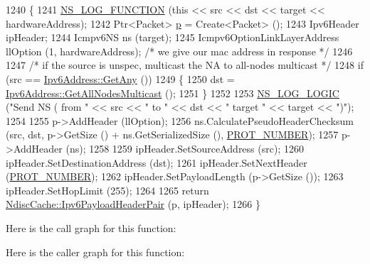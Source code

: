 \begin{DoxyCode}
1240 \{
1241   \hyperlink{log-macros-disabled_8h_a90b90d5bad1f39cb1b64923ea94c0761}{NS\_LOG\_FUNCTION} (\textcolor{keyword}{this} << src << dst << target << hardwareAddress);
1242   Ptr<Packet> \hyperlink{lte__link__budget_8m_ac9de518908a968428863f829398a4e62}{p} = Create<Packet> ();
1243   Ipv6Header ipHeader;
1244   Icmpv6NS ns (target);
1245   Icmpv6OptionLinkLayerAddress llOption (1, hardwareAddress);  \textcolor{comment}{/* we give our mac address in response */}
1246 
1247   \textcolor{comment}{/* if the source is unspec, multicast the NA to all-nodes multicast */}
1248   \textcolor{keywordflow}{if} (src == \hyperlink{classns3_1_1Ipv6Address_a2783e8badfc98c8b0a8508bba6e1b91e}{Ipv6Address::GetAny} ())
1249     \{
1250       dst = \hyperlink{classns3_1_1Ipv6Address_a11e6e4228d3d6e814b2c5ffc18c8ed20}{Ipv6Address::GetAllNodesMulticast} ();
1251     \}
1252 
1253   \hyperlink{group__logging_ga88acd260151caf2db9c0fc84997f45ce}{NS\_LOG\_LOGIC} (\textcolor{stringliteral}{"Send NS ( from "} << src << \textcolor{stringliteral}{" to "} << dst << \textcolor{stringliteral}{" target "} << target << \textcolor{stringliteral}{")"});
1254 
1255   p->AddHeader (llOption);
1256   ns.CalculatePseudoHeaderChecksum (src, dst, p->GetSize () + ns.GetSerializedSize (), 
      \hyperlink{classns3_1_1Icmpv6L4Protocol_aa56c41a886a45b8b4f22a19afc827e2d}{PROT\_NUMBER});
1257   p->AddHeader (ns);
1258 
1259   ipHeader.SetSourceAddress (src);
1260   ipHeader.SetDestinationAddress (dst);
1261   ipHeader.SetNextHeader (\hyperlink{classns3_1_1Icmpv6L4Protocol_aa56c41a886a45b8b4f22a19afc827e2d}{PROT\_NUMBER});
1262   ipHeader.SetPayloadLength (p->GetSize ());
1263   ipHeader.SetHopLimit (255);
1264 
1265   \textcolor{keywordflow}{return} \hyperlink{classns3_1_1NdiscCache_a29c07f4c9da0e923f442f6440666240e}{NdiscCache::Ipv6PayloadHeaderPair} (p, ipHeader);
1266 \}
\end{DoxyCode}


Here is the call graph for this function\+:




Here is the caller graph for this function\+:



